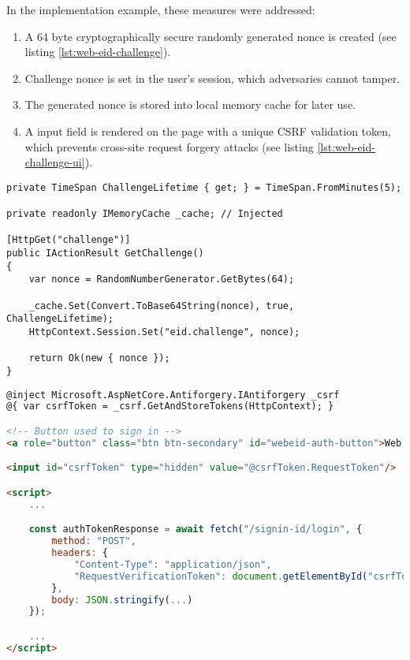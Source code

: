 In the implementation example, these measures were addressed:
\begin{enumerate}
    \item A 64 byte cryptographically secure randomly generated nonce is created (see listing \ref{lst:web-eid-challenge}).
    \item Challenge nonce is set in the user's session, which adversaries cannot tamper.
    \item The generated nonce is stored into local memory cache for later use.
    \item A input field is rendered on the page with a unique CSRF validation token, which prevents cross-site request forgery attacks (see listing \ref{lst:web-eid-challenge-ui}).
\end{enumerate}

\begin{lstlisting}[caption={Web eID Challenge Endpoint}, label={lst:web-eid-challenge}]
private TimeSpan ChallengeLifetime { get; } = TimeSpan.FromMinutes(5);

private readonly IMemoryCache _cache; // Injected

[HttpGet("challenge")]
public IActionResult GetChallenge()
{
    var nonce = RandomNumberGenerator.GetBytes(64);

    _cache.Set(Convert.ToBase64String(nonce), true, ChallengeLifetime);
    HttpContext.Session.Set("eid.challenge", nonce);

    return Ok(new { nonce });
}
\end{lstlisting}


\begin{lstlisting}[caption={Web eID UI excerpt}, label={lst:web-eid-challenge-ui}, language={html}]
@inject Microsoft.AspNetCore.Antiforgery.IAntiforgery _csrf
@{ var csrfToken = _csrf.GetAndStoreTokens(HttpContext); }

<!-- Button used to sign in -->
<a role="button" class="btn btn-secondary" id="webeid-auth-button">Web eID</a>

<input id="csrfToken" type="hidden" value="@csrfToken.RequestToken"/>

<script>
    ...

    const authTokenResponse = await fetch("/signin-id/login", {
        method: "POST",
        headers: {
            "Content-Type": "application/json",
            "RequestVerificationToken": document.getElementById("csrfToken").value
        },
        body: JSON.stringify(...)
    });

    ...
</script>
\end{lstlisting}

